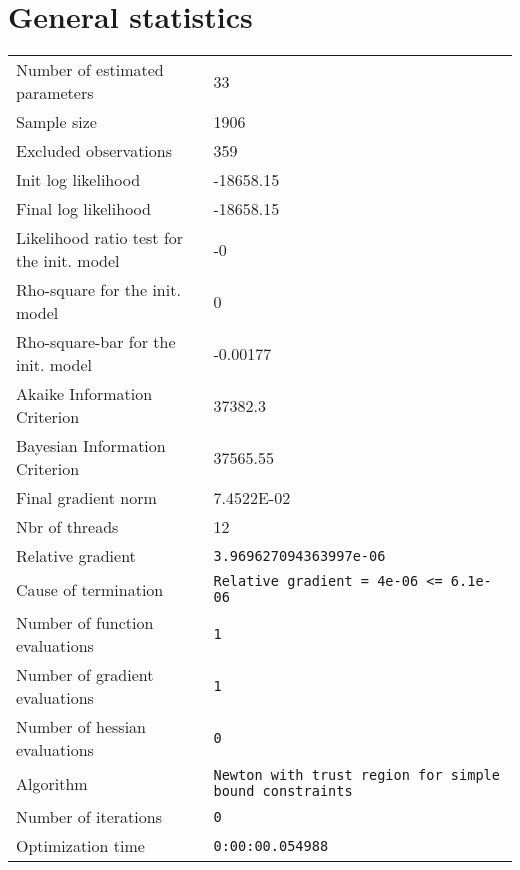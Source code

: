 



\section{General statistics}
\begin{tabular}{ll}
Number of estimated parameters & 33 \\
Sample size & 1906 \\
Excluded observations & 359 \\
Init log likelihood & -18658.15 \\
Final log likelihood & -18658.15 \\
Likelihood ratio test for the init. model & -0 \\
Rho-square for the init. model & 0 \\
Rho-square-bar for the init. model & -0.00177 \\
Akaike Information Criterion & 37382.3 \\
Bayesian Information Criterion & 37565.55 \\
Final gradient norm & 7.4522E-02 \\
Nbr of threads & 12 \\
Relative gradient & \verb$3.969627094363997e-06$ \\
Cause of termination & \verb$Relative gradient = 4e-06 <= 6.1e-06$ \\
Number of function evaluations & \verb$1$ \\
Number of gradient evaluations & \verb$1$ \\
Number of hessian evaluations & \verb$0$ \\
Algorithm & \verb$Newton with trust region for simple bound constraints$ \\
Number of iterations & \verb$0$ \\
Optimization time & \verb$0:00:00.054988$ \\
\end{tabular}

